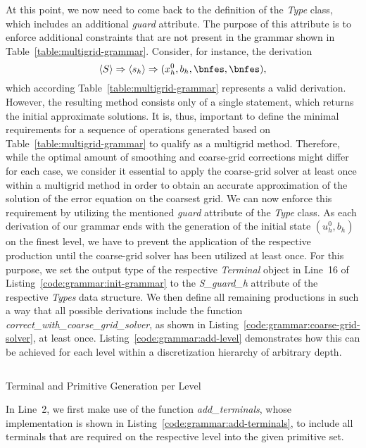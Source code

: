 At this point, we now need to come back to the definition of the \emph{Type} class, which includes an additional \emph{guard} attribute.
The purpose of this attribute is to enforce additional constraints that are not present in the grammar shown in Table~\ref{table:multigrid-grammar}.
Consider, for instance, the derivation
\begin{equation*}
\ps{S} \Rightarrow \ps{s_h} \Rightarrow (x_h^0, b_h, \bnfes, \bnfes),
\end{equation*}
which according Table~\ref{table:multigrid-grammar} represents a valid derivation.
However, the resulting method consists only of a single statement, which returns the initial approximate solutions.
It is, thus, important to define the minimal requirements for a sequence of operations generated based on Table~\ref{table:multigrid-grammar} to qualify as a multigrid method. 
Therefore, while the optimal amount of smoothing and coarse-grid corrections might differ for each case, we consider it essential to apply the coarse-grid solver at least once within a multigrid method in order to obtain an accurate approximation of the solution of the error equation on the coarsest grid.
We can now enforce this requirement by utilizing the mentioned \emph{guard} attribute of the \emph{Type} class.
As each derivation of our grammar ends with the generation of the initial state $\left(u_h^0, b_h\right)$ on the finest level, we have to prevent the application of the respective production until the coarse-grid solver has been utilized at least once.
For this purpose, we set the output type of the respective \emph{Terminal} object in Line~16 of Listing~\ref{code:grammar:init-grammar} to the \emph{S\_guard\_h} attribute of the respective \emph{Types} data structure.
We then define all remaining productions in such a way that all possible derivations include the function \emph{correct\_with\_coarse\_grid\_solver}, as shown in Listing~\ref{code:grammar:coarse-grid-solver}, at least once.
Listing~\ref{code:grammar:add-level} demonstrates how this can be achieved for each level within a discretization hierarchy of arbitrary depth.
\begin{listing}
	\inputminted[linenos]{python}{evostencils/grammar/add_level.py}
	\caption{Terminal and Primitive Generation per Level}
	\label{code:grammar:add-level}
\end{listing}
In Line~2, we first make use of the function \emph{add\_terminals}, whose implementation is shown in Listing~\ref{code:grammar:add-terminals}, to include all terminals that are required on the respective level into the given primitive set.
